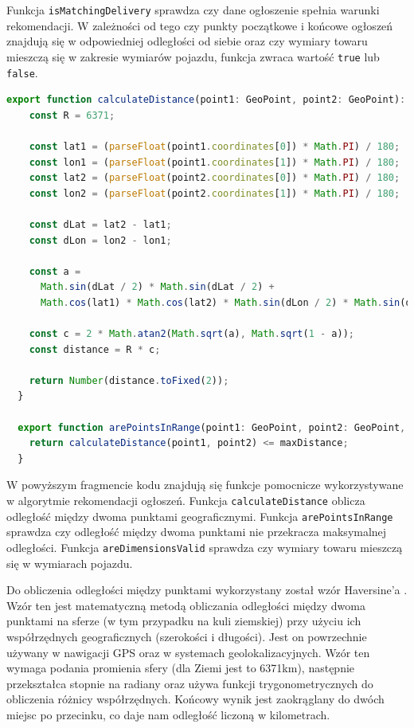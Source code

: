 Funkcja \texttt{isMatchingDelivery} sprawdza czy dane ogłoszenie spełnia warunki rekomendacji. W zależności od tego czy punkty początkowe i końcowe ogłoszeń znajdują się w odpowiedniej odległości od siebie oraz czy wymiary towaru mieszczą się w zakresie wymiarów pojazdu, funkcja zwraca wartość \texttt{true} lub \texttt{false}.

{\belowcaptionskip=-9pt
\begin{lstlisting}[language=JavaScript,caption=Funkcje obliczająca odległość między punktami, label=lst:calculateDistance]
  export function calculateDistance(point1: GeoPoint, point2: GeoPoint): number {
    const R = 6371;
  
    const lat1 = (parseFloat(point1.coordinates[0]) * Math.PI) / 180;
    const lon1 = (parseFloat(point1.coordinates[1]) * Math.PI) / 180;
    const lat2 = (parseFloat(point2.coordinates[0]) * Math.PI) / 180;
    const lon2 = (parseFloat(point2.coordinates[1]) * Math.PI) / 180;
  
    const dLat = lat2 - lat1;
    const dLon = lon2 - lon1;
  
    const a =
      Math.sin(dLat / 2) * Math.sin(dLat / 2) +
      Math.cos(lat1) * Math.cos(lat2) * Math.sin(dLon / 2) * Math.sin(dLon / 2);
  
    const c = 2 * Math.atan2(Math.sqrt(a), Math.sqrt(1 - a));
    const distance = R * c;
  
    return Number(distance.toFixed(2));
  }
  
  export function arePointsInRange(point1: GeoPoint, point2: GeoPoint, maxDistance: number): boolean {
    return calculateDistance(point1, point2) <= maxDistance;
  }
\end{lstlisting}
}

W powyższym fragmencie kodu znajdują się funkcje pomocnicze wykorzystywane w algorytmie rekomendacji ogłoszeń. Funkcja \texttt{calculateDistance} oblicza odległość między dwoma punktami geograficznymi. Funkcja \texttt{arePointsInRange} sprawdza czy odległość między dwoma punktami nie przekracza maksymalnej odległości. Funkcja \texttt{areDimensionsValid} sprawdza czy wymiary towaru mieszczą się w wymiarach pojazdu. 

Do obliczenia odległości między punktami wykorzystany został wzór Haversine'a \cite{HeavenlyMathematics}. Wzór ten jest matematyczną metodą obliczania odległości między dwoma punktami na sferze (w tym przypadku na kuli ziemskiej) przy użyciu ich współrzędnych geograficznych (szerokości i długości). Jest on powrzechnie używany w nawigacji GPS oraz w systemach geolokalizacyjnych. Wzór ten wymaga podania promienia sfery (dla Ziemi jest to 6371km), następnie przekształca stopnie na radiany oraz używa funkcji trygonometrycznych do obliczenia różnicy współrzędnych. Końcowy wynik jest zaokrąglany do dwóch miejsc po przecinku, co daje nam odległość liczoną w kilometrach.

